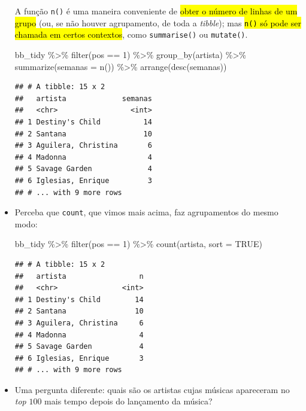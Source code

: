 \documentclass[
  11pt]{report}
\newenvironment{Shaded}{\begin{snugshade}}{\end{snugshade}}
\newcommand{\AttributeTok}[1]{\textcolor[rgb]{0.77,0.63,0.00}{#1}}
\newcommand{\ConstantTok}[1]{\textcolor[rgb]{0.00,0.00,0.00}{#1}}
\newcommand{\DecValTok}[1]{\textcolor[rgb]{0.00,0.00,0.81}{#1}}
\newcommand{\FunctionTok}[1]{\textcolor[rgb]{0.00,0.00,0.00}{#1}}
\newcommand{\NormalTok}[1]{#1}
\newcommand{\SpecialCharTok}[1]{\textcolor[rgb]{0.00,0.00,0.00}{#1}}
\renewenvironment{Shaded}{
    \begin{mdframed}[%
      roundcorner=2pt,%
      innerleftmargin=5pt,%
      innerrightmargin=5pt,%
      topline=true,%
      leftline=true,%
      rightline=true,%
      bottomline=true,%
      linewidth=0.5pt,%
      linecolor=black!20,%
      backgroundcolor=black!2,%
      skipabove=2ex,%
      skipbelow=2.5ex%
    ]%
  }
  {
    \end{mdframed}
  }
\begin{document}
\begin{itemize}
  A função \texttt{n()} é uma maneira conveniente de {\hl{obter o número de linhas de um grupo}} (ou, se não houver agrupamento, de toda a \emph{tibble}); mas {\hl{{\mbox{\texttt{n()}}} só pode ser chamada em certos contextos}}, como \texttt{summarise()} ou \texttt{mutate()}.

\begin{Shaded}
\begin{Highlighting}[]
\NormalTok{bb\_tidy }\SpecialCharTok{\%\textgreater{}\%} 
  \FunctionTok{filter}\NormalTok{(pos }\SpecialCharTok{==} \DecValTok{1}\NormalTok{) }\SpecialCharTok{\%\textgreater{}\%} 
  \FunctionTok{group\_by}\NormalTok{(artista) }\SpecialCharTok{\%\textgreater{}\%}
  \FunctionTok{summarize}\NormalTok{(}\AttributeTok{semanas =} \FunctionTok{n}\NormalTok{()) }\SpecialCharTok{\%\textgreater{}\%} 
  \FunctionTok{arrange}\NormalTok{(}\FunctionTok{desc}\NormalTok{(semanas))}
\end{Highlighting}
\end{Shaded}

\begin{verbatim}
## # A tibble: 15 x 2
##   artista             semanas
##   <chr>                 <int>
## 1 Destiny's Child          14
## 2 Santana                  10
## 3 Aguilera, Christina       6
## 4 Madonna                   4
## 5 Savage Garden             4
## 6 Iglesias, Enrique         3
## # ... with 9 more rows
\end{verbatim}
\item
  Perceba que \texttt{count}, que vimos mais acima, faz agrupamentos do mesmo modo:

\begin{Shaded}
\begin{Highlighting}[]
\NormalTok{bb\_tidy }\SpecialCharTok{\%\textgreater{}\%} 
  \FunctionTok{filter}\NormalTok{(pos }\SpecialCharTok{==} \DecValTok{1}\NormalTok{) }\SpecialCharTok{\%\textgreater{}\%} 
  \FunctionTok{count}\NormalTok{(artista, }\AttributeTok{sort =} \ConstantTok{TRUE}\NormalTok{)}
\end{Highlighting}
\end{Shaded}

\begin{verbatim}
## # A tibble: 15 x 2
##   artista                 n
##   <chr>               <int>
## 1 Destiny's Child        14
## 2 Santana                10
## 3 Aguilera, Christina     6
## 4 Madonna                 4
## 5 Savage Garden           4
## 6 Iglesias, Enrique       3
## # ... with 9 more rows
\end{verbatim}
\item
  Uma pergunta diferente: quais são os artistas cujas músicas apareceram no \emph{top} $100$ mais tempo depois do lançamento da música?


\end{itemize}
\end{document}
